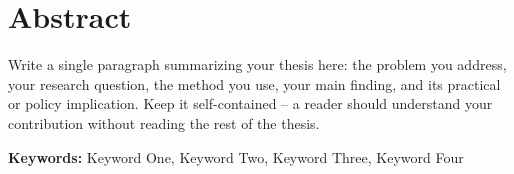 \chapter*{Abstract}

Write a single paragraph summarizing your thesis here: the problem you address, your research question, the method you use, your main finding, and its practical or policy implication. Keep it self-contained -- a reader should understand your contribution without reading the rest of the thesis.

\textbf{Keywords:} Keyword One, Keyword Two, Keyword Three, Keyword Four
